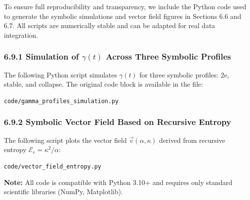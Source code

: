 To ensure full reproducibility and transparency, we include the Python code used to generate the symbolic simulations and vector field figures in Sections 6.6 and 6.7. All scripts are numerically stable and can be adapted for real data integration.

\subsubsection*{6.9.1 Simulation of $\gamma(t)$ Across Three Symbolic Profiles}

The following Python script simulates $\gamma(t)$ for three symbolic profiles: 2e, stable, and collapse. The original code block is available in the file:

\texttt{code/gamma_profiles_simulation.py}



\subsubsection*{6.9.2 Symbolic Vector Field Based on Recursive Entropy}

The following script plots the vector field $\vec{v}(\alpha, \kappa)$ derived from recursive entropy $\mathcal{E}_r = \kappa^2 / \alpha$:

\texttt{code/vector_field_entropy.py}



\bigskip
\noindent
\textbf{Note:} All code is compatible with Python 3.10+ and requires only standard scientific libraries (NumPy, Matplotlib).